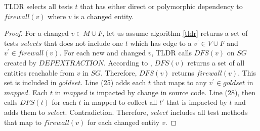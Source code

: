 \begin{theorem}\label{theory}
TLDR selects all tests $t$ that has either direct or polymorphic dependency to $firewall(v)$ where $v$ is a changed entity. 
\end{theorem}
\begin{proof}
For a changed $v \in M \cup F$, let us assume algorithm \ref{tldr} returns a set of tests $selects$ that does not include one $t$ which has edge to a $v^{'} \in V \cup F$ and $v^{'} \in firewall(v)$. For each new and changed $v$, TLDR calls $DFS(v)$ on $SG$ created by $DEPEXTRACTION$. According to \cite{tarjan1972depth}, $DFS(v)$ returns a set of all entities reachable from $v$ in $SG$. Therefore, $DFS(v)$ returns $firewall(v)$. This set is included in $goldset$. Line (25) adds each $t$ that maps to any $v^{'} \in goldset$ in $mapped$. Each $t$ in $mapped$ is impacted by change in source code. Line (28), then calls $DFS(t)$ for each $t$ in mapped to collect all $t'$ that is impacted by $t$ and adds them to $select$.  Contradiction. Therefore, $select$ includes all test methods that map to $firewall(v)$ for each changed entity $v$.

\end{proof}








